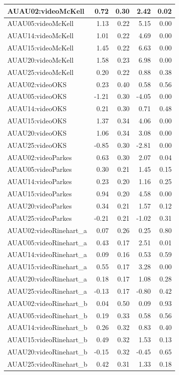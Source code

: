 \documentclass{monashthesis}
\begin{document}
\begin{tabular}{l|r|r|r|r}
\hline
AUAU02:videoMcKell & 0.72 & 0.30 & 2.42 & 0.02\\
\hline
AUAU05:videoMcKell & 1.13 & 0.22 & 5.15 & 0.00\\
\hline
AUAU14:videoMcKell & 1.01 & 0.22 & 4.69 & 0.00\\
\hline
AUAU15:videoMcKell & 1.45 & 0.22 & 6.63 & 0.00\\
\hline
AUAU20:videoMcKell & 1.58 & 0.23 & 6.98 & 0.00\\
\hline
AUAU25:videoMcKell & 0.20 & 0.22 & 0.88 & 0.38\\
\hline
AUAU02:videoOKS & 0.23 & 0.40 & 0.58 & 0.56\\
\hline
AUAU05:videoOKS & -1.21 & 0.30 & -4.05 & 0.00\\
\hline
AUAU14:videoOKS & 0.21 & 0.30 & 0.71 & 0.48\\
\hline
AUAU15:videoOKS & 1.37 & 0.34 & 4.06 & 0.00\\
\hline
AUAU20:videoOKS & 1.06 & 0.34 & 3.08 & 0.00\\
\hline
AUAU25:videoOKS & -0.85 & 0.30 & -2.81 & 0.00\\
\hline
AUAU02:videoParkes & 0.63 & 0.30 & 2.07 & 0.04\\
\hline
AUAU05:videoParkes & 0.30 & 0.21 & 1.45 & 0.15\\
\hline
AUAU14:videoParkes & 0.23 & 0.20 & 1.16 & 0.25\\
\hline
AUAU15:videoParkes & 0.94 & 0.20 & 4.58 & 0.00\\
\hline
AUAU20:videoParkes & 0.34 & 0.21 & 1.57 & 0.12\\
\hline
AUAU25:videoParkes & -0.21 & 0.21 & -1.02 & 0.31\\
\hline
AUAU02:videoRinehart\_a & 0.07 & 0.26 & 0.25 & 0.80\\
\hline
AUAU05:videoRinehart\_a & 0.43 & 0.17 & 2.51 & 0.01\\
\hline
AUAU14:videoRinehart\_a & 0.09 & 0.16 & 0.53 & 0.59\\
\hline
AUAU15:videoRinehart\_a & 0.55 & 0.17 & 3.28 & 0.00\\
\hline
AUAU20:videoRinehart\_a & 0.18 & 0.17 & 1.08 & 0.28\\
\hline
AUAU25:videoRinehart\_a & -0.13 & 0.17 & -0.80 & 0.42\\
\hline
AUAU02:videoRinehart\_b & 0.04 & 0.50 & 0.09 & 0.93\\
\hline
AUAU05:videoRinehart\_b & 0.19 & 0.33 & 0.58 & 0.56\\
\hline
AUAU14:videoRinehart\_b & 0.26 & 0.32 & 0.83 & 0.40\\
\hline
AUAU15:videoRinehart\_b & 0.49 & 0.32 & 1.53 & 0.13\\
\hline
AUAU20:videoRinehart\_b & -0.15 & 0.32 & -0.45 & 0.65\\
\hline
AUAU25:videoRinehart\_b & 0.42 & 0.31 & 1.33 & 0.18\\
\hline
\end{tabular}
\end{document}
